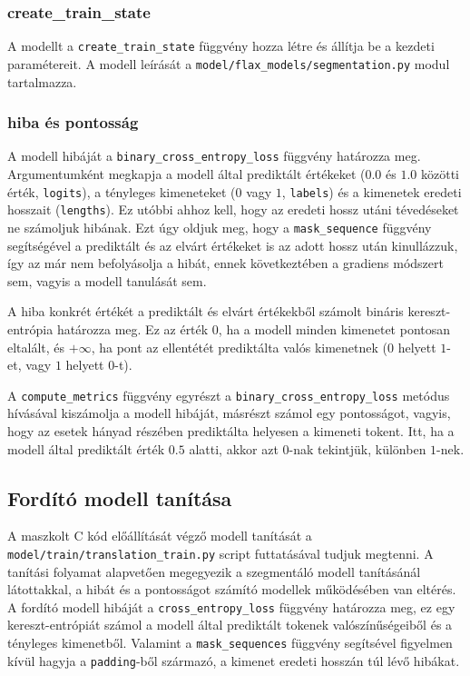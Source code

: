 \subsubsection{create\_train\_state}
A modellt a \texttt{create\_train\_state} függvény hozza létre és állítja be a kezdeti paramétereit.
A modell leírását a \texttt{model/flax\_models/segmentation.py} modul tartalmazza.

\subsubsection{hiba és pontosság}
A modell hibáját a \texttt{binary\_cross\_entropy\_loss} függvény határozza meg. Argumentumként megkapja
a modell által prediktált értékeket ($0.0$ és $1.0$ közötti érték, \texttt{logits}), a tényleges kimeneteket
($0$ vagy $1$, \texttt{labels}) és a kimenetek eredeti hosszait (\texttt{lengths}). Ez utóbbi ahhoz kell,
hogy az eredeti hossz utáni tévedéseket ne számoljuk hibának. Ezt úgy oldjuk meg, hogy a
\texttt{mask\_sequence} függvény segítségével a prediktált és az elvárt értékeket is
az adott hossz után kinullázzuk, így az már nem befolyásolja a hibát, ennek következtében
a gradiens módszert sem, vagyis a modell tanulását sem.

A hiba konkrét értékét a prediktált és elvárt értékekből számolt bináris kereszt-entrópia határozza meg.
Ez az érték $0$, ha a modell minden kimenetet pontosan eltalált, és $+\infty$, ha pont az ellentétét
prediktálta valós kimenetnek ($0$ helyett $1$-et, vagy $1$ helyett $0$-t).

A \texttt{compute\_metrics} függvény egyrészt a \texttt{binary\_cross\_entropy\_loss} metódus hívásával
kiszámolja a modell hibáját, másrészt számol egy pontosságot, vagyis, hogy az esetek hányad részében
prediktálta helyesen a kimeneti tokent. Itt, ha a modell által prediktált érték $0.5$ alatti, akkor azt
$0$-nak tekintjük, különben $1$-nek.

\subsection{Fordító modell tanítása}
A maszkolt C kód előállítását végző modell tanítását a \texttt{model/train/translation\_train.py}
script futtatásával tudjuk megtenni. A tanítási folyamat alapvetően megegyezik a szegmentáló modell
tanításánál látottakkal, a hibát és a pontosságot számító modellek működésében van eltérés.
A fordító modell hibáját a \texttt{cross\_entropy\_loss} függvény határozza meg, ez egy kereszt-entrópiát
számol a modell által prediktált tokenek valószínűségeiből és a tényleges kimenetből. Valamint a
\texttt{mask\_sequences} függvény segítsével figyelmen kívül hagyja a \texttt{padding}-ből származó,
a kimenet eredeti hosszán túl lévő hibákat.

